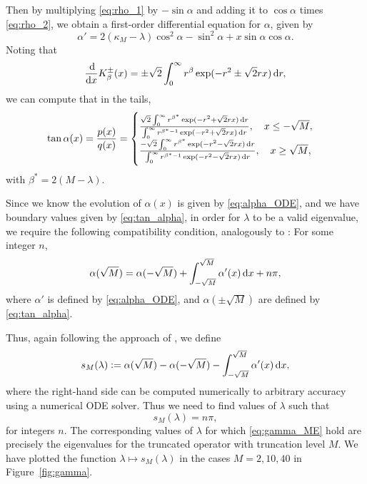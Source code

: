 \documentclass{aptpub}
\begin{document}
Then by multiplying \eqref{eq:rho_1} by $-\sin \alpha$ and adding it to $\cos \alpha$ times \eqref{eq:rho_2}, we obtain a first-order differential equation for $\alpha$, given by
\begin{equation}
    \alpha' = 2(\kappa_M-\lambda) \cos^2 \alpha -\sin^2 \alpha +x \sin \alpha \cos \alpha.
    \label{eq:alpha_ODE}
\end{equation}
Noting that
\begin{equation*}
    \frac\dif {\dif x}K_\beta^\pm(x) = \pm \sqrt 2\int_0^\infty r^\beta \exp(-r^2 \pm \sqrt 2 rx)\dif r,
\end{equation*}
we can compute that in the tails,
\begin{equation}
    \tan \alpha(x) = \frac{p(x)}{q(x)}=
    \begin{cases}
        \frac{\sqrt 2 \int_0^\infty r^{\beta^*} \exp(-r^2 + \sqrt 2 rx)\dif r }{\int_0^\infty r^{{\beta^*}-1} \exp(-r^2 + \sqrt 2 rx)\dif r} , \quad x\le -\sqrt M, \\
        \frac{-\sqrt 2 \int_0^\infty r^{\beta^*} \exp(-r^2 - \sqrt 2 rx)\dif r }{\int_0^\infty r^{{\beta^*}-1} \exp(-r^2 - \sqrt 2 rx)\dif r},\quad x\ge  \sqrt M,
    \end{cases}
    \label{eq:tan_alpha}
\end{equation}
with ${\beta^*} = 2(M-\lambda)$. 

Since we know the evolution of $\alpha(x)$ is given by \eqref{eq:alpha_ODE}, and we have boundary values given by \eqref{eq:tan_alpha}, in order for $\lambda$ to be a valid eigenvalue, we require the following compatibility condition, analogously to \cite{Mielnik1996}: For some integer $n$,
\begin{equation*}
    \alpha(\sqrt M) = \alpha(-\sqrt M)+ \int_{-\sqrt{M}}^{\sqrt{M}}   \alpha'(x) \dif x +n \pi,
\end{equation*}
where $\alpha'$ is defined by \eqref{eq:alpha_ODE}, and $\alpha (\pm \sqrt M)$ are defined by \eqref{eq:tan_alpha}.

Thus, again following the approach of \cite{Mielnik1996}, we define
\begin{equation}
    s_M(\lambda):= \alpha(\sqrt M) - \alpha(-\sqrt M)- \int_{-\sqrt{M}}^{\sqrt{M}}  \alpha'(x) \dif x,
    \label{eq:s_M_def}
\end{equation}
where the right-hand side can be computed numerically to arbitrary accuracy using a numerical ODE solver. Thus we need to find values of $\lambda$ such that
\begin{equation}
    s_M(\lambda) = n\pi,
    \label{eq:gamma_ME}
\end{equation}
for integers $n$. The corresponding values of $\lambda$ for which \eqref{eq:gamma_ME} hold are precisely the eigenvalues for the truncated operator with truncation level $M$.
We have plotted the function $\lambda\mapsto s_M(\lambda)$ in the cases $M=2,10,40$ in Figure~\ref{fig:gamma}.
\end{document}
